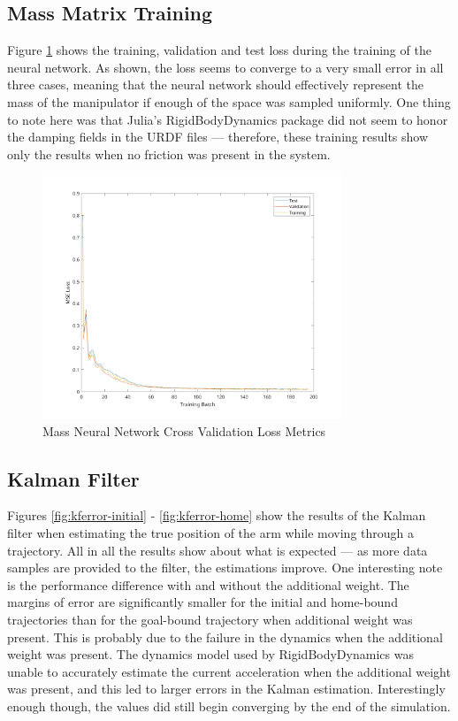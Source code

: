 \subsection*{Mass Matrix Training}

Figure \ref{fig:massnnloss} shows the training, validation and test loss during the training of the neural network.
As shown, the loss seems to converge to a very small error in all three cases, meaning that the neural network should effectively represent the mass of the manipulator if enough of the space was sampled uniformly.
One thing to note here was that Julia's RigidBodyDynamics package did not seem to honor the damping fields in the URDF files --- therefore, these training results show only the results when no friction was present in the system.

\begin{figure}[H]
  \centering
  \includegraphics[width=0.8\textwidth]{figures/massnnloss_plot.png}
  \caption{Mass Neural Network Cross Validation Loss Metrics}
  \label{fig:massnnloss}
\end{figure}

\subsection*{Kalman Filter}
Figures \ref{fig:kferror-initial} - \ref{fig:kferror-home} show the results of the Kalman filter when estimating the true position of the arm while moving through a trajectory.
All in all the results show about what is expected --- as more data samples are provided to the filter, the estimations improve.
One interesting note is the performance difference with and without the additional weight.
The margins of error are significantly smaller for the initial and home-bound trajectories than for the goal-bound trajectory when additional weight was present.
This is probably due to the failure in the dynamics when the additional weight was present.
The dynamics model used by RigidBodyDynamics was unable to accurately estimate the current acceleration when the additional weight was present, and this led to larger errors in the Kalman estimation.
Interestingly enough though, the values did still begin converging by the end of the simulation.

